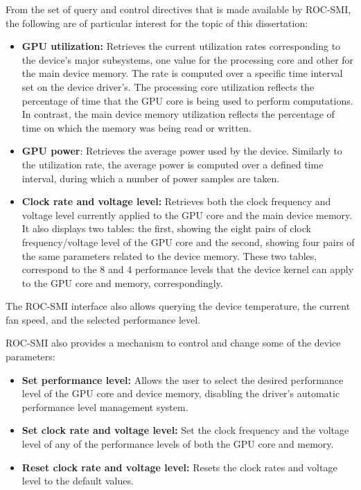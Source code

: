 From the set of query and control directives that is made available by ROC-SMI, the following are of particular interest for the topic of this dissertation:

\begin{itemize}
\item \textbf{GPU utilization:} Retrieves the current utilization rates corresponding to the device's major subsystems, one value for the processing core and other for the main device memory. The rate is computed over a specific time interval set on the device driver's. The processing core utilization reflects the percentage of time that the GPU core is being used to perform computations. In contrast, the main device memory utilization reflects the percentage of time on which the memory was being read or written.

\item \textbf{GPU power}: Retrieves the average power used by the device. Similarly to the utilization rate, the average power is computed over a defined time interval, during which a number of power samples are taken.

\item \textbf{Clock rate and voltage level:} Retrieves both the clock frequency and voltage level currently applied to the GPU core and the main device memory. It also displays two tables: the first, showing the eight pairs of clock frequency/voltage level of the GPU core and the second, showing four pairs of the same parameters related to the device memory. These two tables, correspond to the 8 and 4 performance levels that the device kernel can apply to the GPU core and memory, correspondingly.
\end{itemize}

The ROC-SMI interface also allows querying the device temperature, the current fan speed, and the selected performance level.

ROC-SMI also provides a mechanism to control and change some of the device parameters:
\begin{itemize}
\item \textbf{Set performance level:} Allows the user to select the desired performance level of the GPU core and device memory, disabling the driver's automatic performance level management system.
\item \textbf{Set clock rate and voltage level:} Set the clock frequency and the voltage level of any of the performance levels of both the GPU core and memory. 
\item \textbf{Reset clock rate and voltage level:} Resets the clock rates and voltage level to the default values.
\end{itemize}

